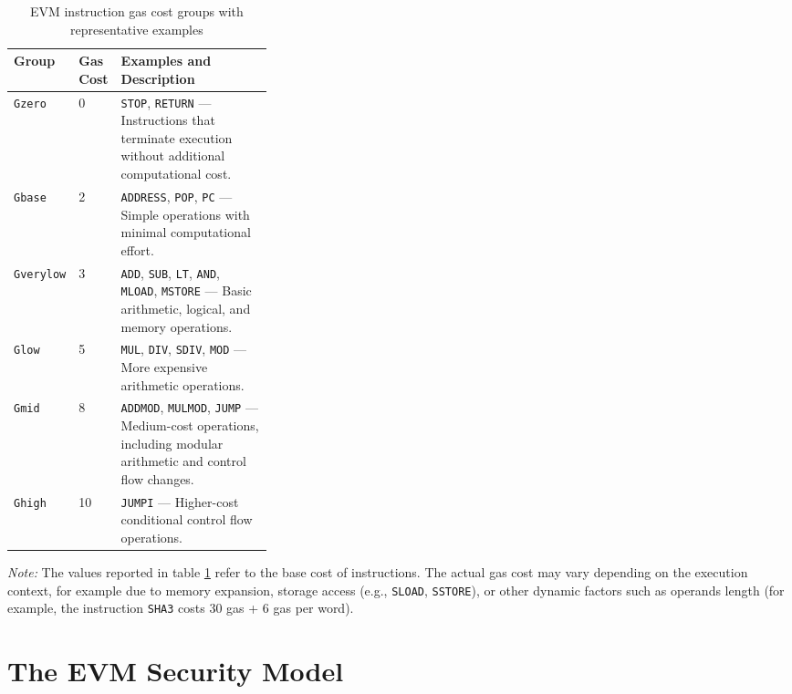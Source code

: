 \documentclass{scrbook}
\begin{document}
\begin{table}[h!]
    \centering
    \begin{tabularx}{\linewidth}{|p{0.18\linewidth}|p{0.15\linewidth}|X|}
        \hline
        \textbf{Group} & \textbf{Gas Cost} & \textbf{Examples and Description} \\ \hline
        
        \texttt{Gzero} & 0 
        & \texttt{STOP}, \texttt{RETURN} --- Instructions that terminate execution without additional computational cost. \\ \hline
        
        \texttt{Gbase} & 2 
        & \texttt{ADDRESS}, \texttt{POP}, \texttt{PC} --- Simple operations with minimal computational effort. \\ \hline
        
        \texttt{Gverylow} & 3 
        & \texttt{ADD}, \texttt{SUB}, \texttt{LT}, \texttt{AND}, \texttt{MLOAD}, \texttt{MSTORE} --- Basic arithmetic, logical, and memory operations. \\ \hline
        
        \texttt{Glow} & 5 
        & \texttt{MUL}, \texttt{DIV}, \texttt{SDIV}, \texttt{MOD} --- More expensive arithmetic operations. \\ \hline
        
        \texttt{Gmid} & 8 
        & \texttt{ADDMOD}, \texttt{MULMOD}, \texttt{JUMP} --- Medium-cost operations, including modular arithmetic and control flow changes. \\ \hline
        
        \texttt{Ghigh} & 10 
        & \texttt{JUMPI} --- Higher-cost conditional control flow operations. \\ \hline
        
    \end{tabularx}
    \caption{EVM instruction gas cost groups with representative examples}
    \label{tbl:instruction_costs_group}
\end{table}

\noindent
\textit{Note:} The values reported in table \ref{tbl:instruction_costs_group} refer to the base cost of instructions. 
The actual gas cost may vary depending on the execution context, for example due to memory expansion, storage access (e.g., \texttt{SLOAD}, \texttt{SSTORE}), or other dynamic factors such as operands length (for example, the instruction \texttt{SHA3} costs 30 gas + 6 gas per word).

\section{The EVM Security Model}
\end{document}
